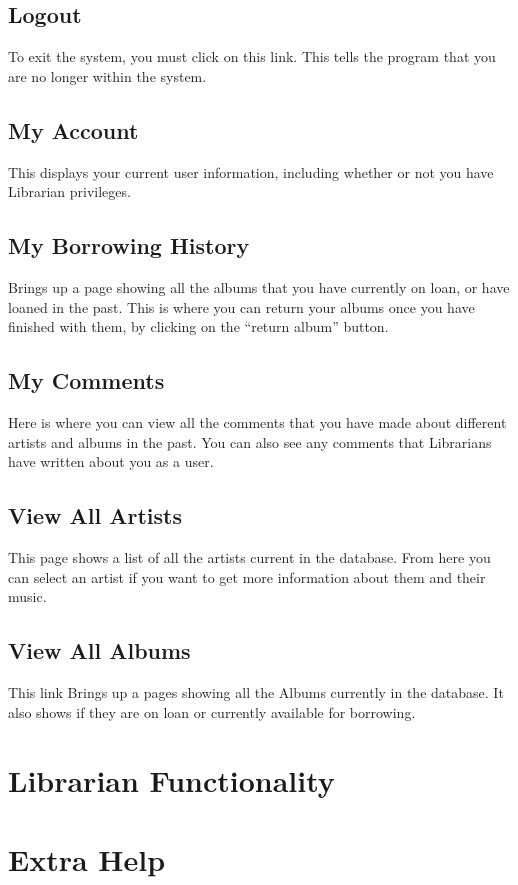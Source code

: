 \documentclass{article}
\begin{document}
\subsection{Logout}
To exit the system, you must click on this link. This tells the program that you are no longer within the system.
\subsection{My Account}
This displays your current user information, including whether or not you have Librarian privileges.
\subsection{My Borrowing History}
Brings up a page showing all the albums that you have currently on loan, or have loaned in the past. This is where you can return your albums once you have finished with them, by clicking on the ``return album'' button.
\subsection{My Comments}
Here is where you can view all the comments that you have made about different artists and albums in the past. You can also see any comments that Librarians have written about you as a user.
\subsection{View All Artists}
This page shows a list of all the artists current in the database. From here you can select an artist if you want to get more information about them and their music.
\subsection{View All Albums}
This link Brings up a pages showing all the Albums currently in the database. It also shows if they are on loan or currently available for borrowing.


\section{Librarian Functionality}

\section{Extra Help}
\end{document}
